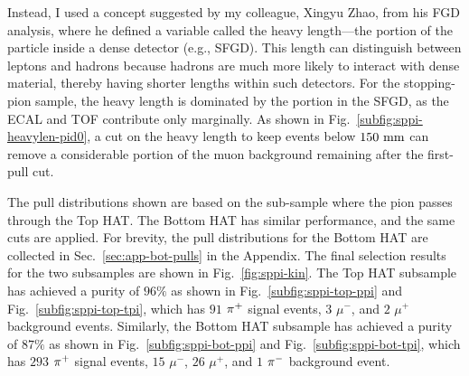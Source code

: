           Instead, I used a concept suggested by my colleague, Xingyu Zhao, from his FGD analysis, where he defined a variable called the heavy length—the portion of the particle inside a dense detector (e.g., SFGD).
          This length can distinguish between leptons and hadrons because hadrons are much more likely to interact with dense material, thereby having shorter lengths within such detectors.
          For the stopping-pion sample, the heavy length is dominated by the portion in the SFGD, as the ECAL and TOF contribute only marginally.
          As shown in Fig.~\ref{subfig:sppi-heavylen-pid0}, a cut on the heavy length to keep events below $150~\textrm{mm}$ can remove a considerable portion of the muon background remaining after the first-pull cut.

          The pull distributions shown are based on the sub-sample where the pion passes through the Top HAT.
          The Bottom HAT has similar performance, and the same cuts are applied.
          For brevity, the pull distributions for the Bottom HAT are collected in Sec.~\ref{sec:app-bot-pulls} in the Appendix.
          The final selection results for the two subsamples are shown in Fig.~\ref{fig:sppi-kin}.
          The Top HAT subsample has achieved a purity of $96\%$ as shown in Fig.~\ref{subfig:sppi-top-ppi} and Fig.~\ref{subfig:sppi-top-tpi}, which has $91$ $\pi^+$ signal events, $3$ $\mu^-$, and $2$ $\mu^+$ background events.
          Similarly, the Bottom HAT subsample has achieved a purity of $87\%$ as shown in Fig.~\ref{subfig:sppi-bot-ppi} and Fig.~\ref{subfig:sppi-bot-tpi}, which has $293$ $\pi^+$ signal events, $15$ $\mu^-$, $26$ $\mu^+$, and $1$ $\pi^-$ background event.

